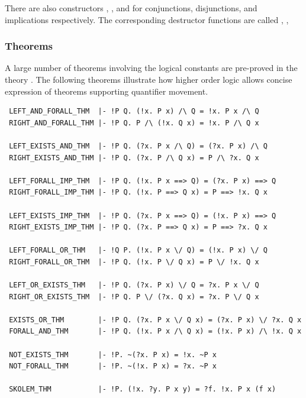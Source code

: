 \noindent There are also constructors
,
,
 and
for conjunctions, disjunctions, and implications respectively.
The corresponding destructor functions are called , \etc,
%
%
%

\subsubsection{Theorems}

A large number of theorems involving the logical constants are
pre-proved in the theory . The following theorems
illustrate how higher order logic allows concise expression of
theorems supporting quantifier movement.

\begin{holboxed}
\begin{verbatim}
 LEFT_AND_FORALL_THM  |- !P Q. (!x. P x) /\ Q = !x. P x /\ Q
 RIGHT_AND_FORALL_THM |- !P Q. P /\ (!x. Q x) = !x. P /\ Q x

 LEFT_EXISTS_AND_THM  |- !P Q. (?x. P x /\ Q) = (?x. P x) /\ Q
 RIGHT_EXISTS_AND_THM |- !P Q. (?x. P /\ Q x) = P /\ ?x. Q x

 LEFT_FORALL_IMP_THM  |- !P Q. (!x. P x ==> Q) = (?x. P x) ==> Q
 RIGHT_FORALL_IMP_THM |- !P Q. (!x. P ==> Q x) = P ==> !x. Q x

 LEFT_EXISTS_IMP_THM  |- !P Q. (?x. P x ==> Q) = (!x. P x) ==> Q
 RIGHT_EXISTS_IMP_THM |- !P Q. (?x. P ==> Q x) = P ==> ?x. Q x

 LEFT_FORALL_OR_THM   |- !Q P. (!x. P x \/ Q) = (!x. P x) \/ Q
 RIGHT_FORALL_OR_THM  |- !P Q. (!x. P \/ Q x) = P \/ !x. Q x

 LEFT_OR_EXISTS_THM   |- !P Q. (?x. P x) \/ Q = ?x. P x \/ Q
 RIGHT_OR_EXISTS_THM  |- !P Q. P \/ (?x. Q x) = ?x. P \/ Q x

 EXISTS_OR_THM        |- !P Q. (?x. P x \/ Q x) = (?x. P x) \/ ?x. Q x
 FORALL_AND_THM       |- !P Q. (!x. P x /\ Q x) = (!x. P x) /\ !x. Q x

 NOT_EXISTS_THM       |- !P. ~(?x. P x) = !x. ~P x
 NOT_FORALL_THM       |- !P. ~(!x. P x) = ?x. ~P x

 SKOLEM_THM           |- !P. (!x. ?y. P x y) = ?f. !x. P x (f x)
\end{verbatim}
\end{holboxed}

